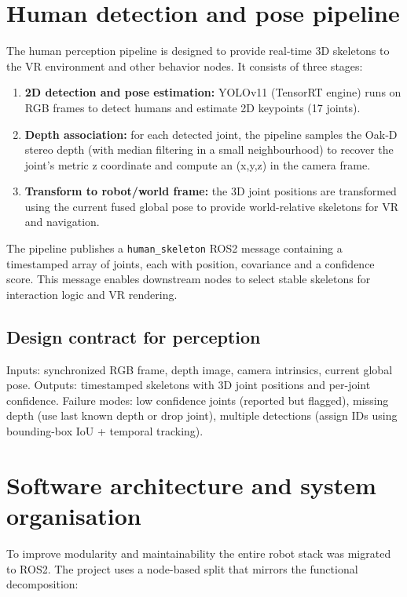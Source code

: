 \section{Human detection and pose pipeline}

The human perception pipeline is designed to provide real-time 3D skeletons to the VR environment and other behavior nodes. It consists of three stages:

\begin{enumerate}
	\item \textbf{2D detection and pose estimation:} YOLOv11 (TensorRT engine) runs on RGB frames to detect humans and estimate 2D keypoints (17 joints).
	\item \textbf{Depth association:} for each detected joint, the pipeline samples the Oak‑D stereo depth (with median filtering in a small neighbourhood) to recover the joint's metric z coordinate and compute an (x,y,z) in the camera frame.
	\item \textbf{Transform to robot/world frame:} the 3D joint positions are transformed using the current fused global pose to provide world-relative skeletons for VR and navigation.
\end{enumerate}

The pipeline publishes a \texttt{human\_skeleton} ROS2 message containing a timestamped array of joints, each with position, covariance and a confidence score. This message enables downstream nodes to select stable skeletons for interaction logic and VR rendering.

\subsection*{Design contract for perception}
Inputs: synchronized RGB frame, depth image, camera intrinsics, current global pose.
Outputs: timestamped skeletons with 3D joint positions and per-joint confidence.
Failure modes: low confidence joints (reported but flagged), missing depth (use last known depth or drop joint), multiple detections (assign IDs using bounding-box IoU + temporal tracking).

\section{Software architecture and system organisation}

To improve modularity and maintainability the entire robot stack was migrated to ROS2. The project uses a node-based split that mirrors the functional decomposition:

